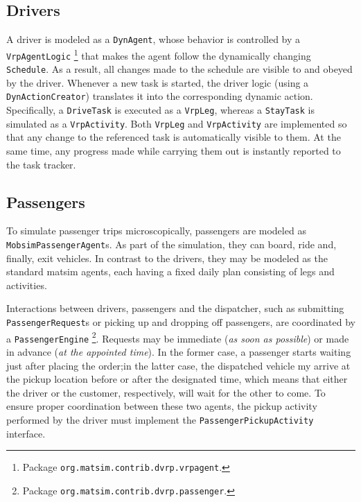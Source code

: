 \subsection{Drivers}
\label{sec:VRP-agent}
A driver is modeled as a \lstinline$DynAgent$, whose behavior is controlled by a \lstinline$VrpAgentLogic$%
\footnote{
Package \lstinline$org.matsim.contrib.dvrp.vrpagent$.
}
that makes the agent follow the dynamically changing \lstinline$Schedule$. As a result, all changes made to the schedule are visible to and obeyed by the driver. Whenever a new task is started, the driver logic (using a \lstinline$DynActionCreator$) translates it into the corresponding dynamic action. Specifically, a \lstinline$DriveTask$ is executed as a \lstinline$VrpLeg$, whereas a \lstinline$StayTask$ is simulated as a \lstinline$VrpActivity$. Both \lstinline$VrpLeg$ and \lstinline$VrpActivity$ are implemented so that any change to the referenced task is automatically visible to them. At the same time, any progress made while carrying them out is instantly reported to the task tracker.

\subsection{Passengers}
\label{sec:VRP-passengers}
To simulate passenger trips microscopically, passengers are modeled as \lstinline$MobsimPassengerAgent$s. As part of the simulation, they can board, ride and, finally, exit vehicles. In contrast to the drivers, they may be modeled as the standard \gls{matsim} agents, each having a fixed daily plan consisting of legs and activities.

Interactions between drivers, passengers and the dispatcher, such as submitting \lstinline$PassengerRequest$s or picking up and dropping off passengers, are coordinated by a \lstinline{PassengerEngine}%
\footnote{
Package \lstinline$org.matsim.contrib.dvrp.passenger$.
}.
Requests may be immediate (\emph{as soon as possible}) or made in advance (\emph{at the appointed time}). In the former case, a passenger starts waiting just after placing the order;in the latter case, the dispatched vehicle my arrive at the pickup location before or after the designated time, which means that either the driver or the customer, respectively, will wait for the other to come. To ensure proper coordination between these two agents, the pickup activity performed by the driver must implement the \lstinline$PassengerPickupActivity$ interface.

